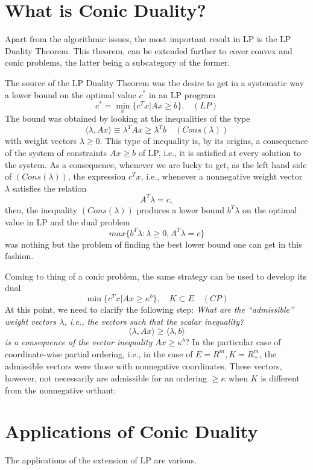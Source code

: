 \documentclass[12pt]{article}
\begin{document}
    \section{What is Conic Duality?}
    \par Apart from the algorithmic issues, the most important result in LP is the LP Duality Theorem. This theorem, can be extended further to cover convex and conic problems, the latter being a subcategory of the former. \par
    The source of the LP Duality Theorem was the desire to get in a systematic way a lower bound on the
    optimal value $c^*$ in an LP program
    $$c^* = \min\limits_{x} \{ c^T x | Ax \geq b \}. \quad (LP)$$
    The bound was obtained by looking at the inequalities of the type 
    $$\langle \lambda, Ax\rangle \equiv \lambda^T Ax \geq \lambda^T b \quad (Cons(\lambda))$$
    with weight vectors $\lambda \geq 0$. This type of inequality is, by its origins, a consequence of the system of constraints $Ax \geq b$ of LP, i.e., it is satisfied at every solution to the system. As a consequence, whenever we are lucky to get, as the left hand side of $(Cons(\lambda))$, the expression $c^T x$, i.e., whenever a nonnegative weight vector $\lambda$ satisfies the relation 
    $$A^T \lambda = c,$$
    then, the inequality $(Cons(\lambda))$ produces a lower bound $b^T \lambda$ on the optimal value in LP 
    and the dual problem 
    $$max \{b^T \lambda : \lambda \geq 0, A^T \lambda = c\}$$
    was nothing but the problem of finding the best lower bound one can get in this fashion.\par
    Coming to thing of a conic problem, the same strategy can be used to develop its dual
    $$\min \{ c^T x | Ax \geq \kappa^b \}, \quad K \subset E \quad (CP)$$
    At this point, we need to clarify the following step:\newline \newline
    \textit{What are the “admissible” weight vectors $\lambda$, i.e., the vectors such that the scalar 
    inequality?}
    $$\langle \lambda, Ax\rangle \geq \langle \lambda, b\rangle$$
    \textit{is a consequence of the vector inequality} $Ax \geq \kappa^b ?$ \newline \newline
    In the particular case of coordinate-wise partial ordering, i.e., in the case of $E = R^m , K = R_+^m $, 
    the admissible vectors were those with nonnegative coordinates. These vectors, however, not necessarily 
    are admissible for an ordering $\geq \kappa$ when $K$ is different from the nonnegative orthant:
    
    
    \section{Applications of Conic Duality }
    \par The applications of the extension of LP are various. 
\end{document}
